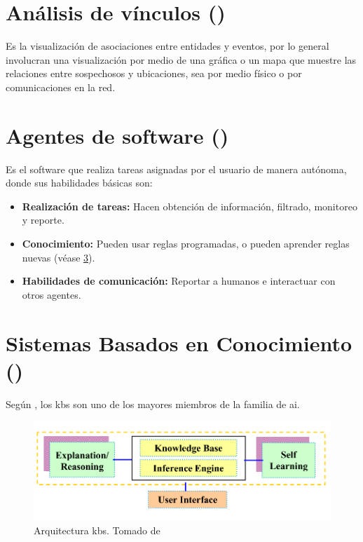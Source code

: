 
\section{Análisis de vínculos ()}
Es la visualización de asociaciones entre entidades y eventos, por lo general involucran una visualización por medio de una gráfica o un mapa que muestre las relaciones entre sospechosos y ubicaciones, sea por medio físico o por comunicaciones en la red.


\section{Agentes de software ()}
Es el software que realiza tareas asignadas por el usuario de manera autónoma, donde sus habilidades básicas son:
\begin{itemize}
\item \textbf{Realización de tareas:} Hacen obtención de información, filtrado, monitoreo y reporte.
\item \textbf{Conocimiento:} Pueden usar reglas programadas, o pueden aprender reglas nuevas (véase \ref{secKBS}).
\item \textbf{Habilidades de comunicación:} Reportar a humanos e interactuar con otros agentes.
\end{itemize}


\section{Sistemas Basados en Conocimiento ()} \label{secKBS}
Según \cite{sajja2010knowledge}, los \gls{kbs} son uno de los mayores miembros de la familia de \gls{ai}.

\begin{figure}[th]
\centering
\includegraphics[scale=0.4]{Figures/kbs-architecture.png}
\decoRule
\caption[Arquitectura \gls{kbs}]{Arquitectura \gls{kbs}. Tomado de \cite{sajja2010knowledge}}
\label{fig:kbs-arch}
\end{figure}

